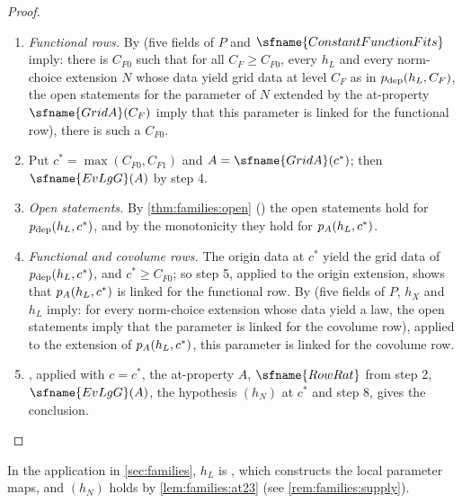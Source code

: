 \begin{proof}
\begin{enumerate}[label=\arabic*.]
eventually and for large twisting data.
\item \emph{Functional rows.} By  (five fields of $P$ and
$\sfname{ConstantFunctionFits}$ imply: there is $C_{F0}$ such that for all $C_F\ge C_{F0}$, every $h_L$ and every norm-choice
extension $N$ whose data yield grid data at level $C_F$ as in $p_{\mathrm{dep}}(h_L,C_F)$, the open statements for the parameter of
$N$ extended by the at-property $\sfname{GridA}(C_F)$ imply that this parameter is linked for the functional row), there is
such a $C_{F0}$.
\item Put $c^*=\max(C_{F0},C_{F1})$ and $A=\sfname{GridA}(c^*)$; then $\sfname{EvLgG}(A)$ by step 4.
\item \emph{Open statements.} By \cref{thm:families:open} () the open
statements hold for $p_{\mathrm{dep}}(h_L,c^*)$, and by the monotonicity they hold for $p_{A}(h_L,c^*)$.
\item \emph{Functional and covolume rows.} The origin data at $c^*$ yield the grid data of $p_{\mathrm{dep}}(h_L,c^*)$, and
$c^*\ge C_{F0}$; so step 5, applied to the origin extension, shows that $p_{A}(h_L,c^*)$ is linked for the functional row.
By  (five fields of $P$, $h_X$ and $h_L$ imply: for every
norm-choice extension whose data yield a law, the open statements imply that the parameter is linked for the covolume row),
applied to the extension of $p_{A}(h_L,c^*)$, this parameter is linked for the covolume row.
\item {}, applied with $c=c^*$, the at-property $A$, $\sfname{RowRat}$ from step 2, $\sfname{EvLgG}(A)$,
the hypothesis $(h_N)$ at $c^*$ and step 8, gives the conclusion.\qedhere
\end{enumerate}
\end{proof}

In the application in \cref{sec:families}, $h_L$ is , which constructs the local
parameter maps, and $(h_N)$ holds by \cref{lem:families:at23} (see \cref{rem:families:supply}).


